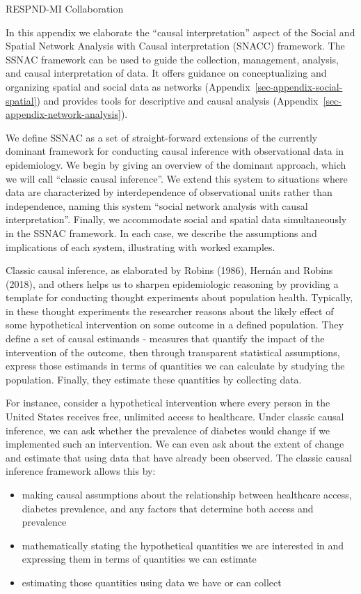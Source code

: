 \documentclass[
  letterpaper,
  DIV=11,
  numbers=noendperiod,
  oneside]{scrreprt}
\begin{document}
RESPND-MI Collaboration

In this appendix we elaborate the ``causal interpretation'' aspect of
the Social and Spatial Network Analysis with Causal interpretation
(SNACC) framework. The SSNAC framework can be used to guide the
collection, management, analysis, and causal interpretation of data. It
offers guidance on conceptualizing and organizing spatial and social
data as networks (Appendix~\ref{sec-appendix-social-spatial}) and
provides tools for descriptive and causal analysis
(Appendix~\ref{sec-appendix-network-analysis}).

We define SSNAC as a set of straight-forward extensions of the currently
dominant framework for conducting causal inference with observational
data in epidemiology. We begin by giving an overview of the dominant
approach, which we will call ``classic causal inference''. We extend
this system to situations where data are characterized by
interdependence of observational units rather than independence, naming
this system ``social network analysis with causal interpretation''.
Finally, we accommodate social and spatial data simultaneously in the
SSNAC framework. In each case, we describe the assumptions and
implications of each system, illustrating with worked examples.

Classic causal inference, as elaborated by Robins (1986), Hernán and
Robins (2018), and others helps us to sharpen epidemiologic reasoning by
providing a template for conducting thought experiments about population
health. Typically, in these thought experiments the researcher reasons
about the likely effect of some hypothetical intervention on some
outcome in a defined population. They define a set of causal estimands -
measures that quantify the impact of the intervention of the outcome,
then through transparent statistical assumptions, express those
estimands in terms of quantities we can calculate by studying the
population. Finally, they estimate these quantities by collecting data.

For instance, consider a hypothetical intervention where every person in
the United States receives free, unlimited access to healthcare. Under
classic causal inference, we can ask whether the prevalence of diabetes
would change if we implemented such an intervention. We can even ask
about the extent of change and estimate that using data that have
already been observed. The classic causal inference framework allows
this by:

\begin{itemize}
\item
  making causal assumptions about the relationship between healthcare
  access, diabetes prevalence, and any factors that determine both
  access and prevalence
\item
  mathematically stating the hypothetical quantities we are interested
  in and expressing them in terms of quantities we can estimate
\item
  estimating those quantities using data we have or can collect
\end{itemize}
\end{document}
